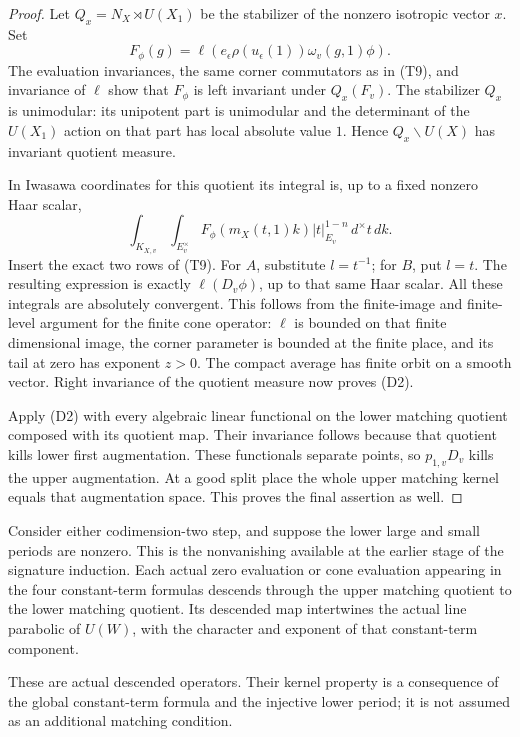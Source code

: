\begin{proof}
Let \(Q_x=N_X\rtimes U(X_1)\) be the stabilizer of the nonzero
isotropic vector \(x\). Set
\[
       F_\phi(g)=
            \ell(e_\epsilon\rho(u_\epsilon(1))
                                      \omega_v(g,1)\phi).
\]
The evaluation invariances, the same corner commutators as in (T9),
and invariance of \(\ell\) show that \(F_\phi\) is left invariant
under \(Q_x(F_v)\). The stabilizer \(Q_x\) is unimodular: its
unipotent part is unimodular and the determinant of the
\(U(X_1)\) action on that part has local absolute value \(1\).
Hence \(Q_x\backslash U(X)\) has invariant quotient measure.

In Iwasawa coordinates for this quotient its integral is, up to
a fixed nonzero Haar scalar,
\[
 \int_{K_{X,v}}\int_{E_v^\times}
       F_\phi(m_X(t,1)k)|t|_{E_v}^{1-n}\,d^\times t\,dk .
\]
Insert the exact two rows of (T9).
For \(A\), substitute \(l=t^{-1}\); for \(B\), put \(l=t\).
The resulting expression is exactly \(\ell(D_v\phi)\), up to
that same Haar scalar. All these integrals are absolutely
convergent. This follows from the finite-image and finite-level
argument for the finite cone operator: \(\ell\) is bounded on
that finite dimensional image, the corner parameter is bounded
at the finite place, and its tail at zero has exponent \(z>0\).
The compact average has finite orbit on a smooth vector.
Right invariance of the quotient measure now proves (D2).

Apply (D2) with every algebraic linear functional on the lower
matching quotient composed with its quotient map. Their
invariance follows because that quotient kills lower first
augmentation. These functionals separate points, so
\(p_{1,v}D_v\) kills the upper augmentation.
At a good split place the whole upper matching kernel equals
that augmentation space. This proves the final assertion as well.
\end{proof}

\begin{srproposition}
\label{prop:sr-theta-constant-term-descent}
Consider either codimension-two step, and suppose the lower
large and small periods are nonzero. This is the nonvanishing
available at the earlier stage of the signature induction.
Each actual zero evaluation or cone evaluation appearing in the
four constant-term formulas descends through the upper matching
quotient to the lower matching quotient. Its descended map
intertwines the actual line parabolic of \(U(W)\), with the
character and exponent of that constant-term component.

These are actual descended operators. Their kernel property is
a consequence of the global constant-term formula and the
injective lower period; it is not assumed as an additional
matching condition.
\end{srproposition}

